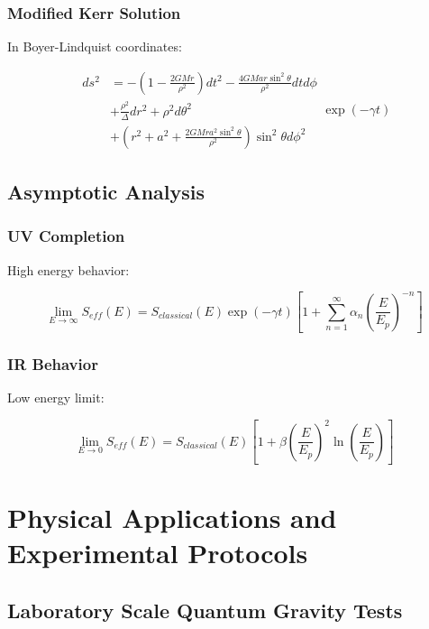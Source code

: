 \documentclass[12pt]{article}
\theoremstyle{plain}
\theoremstyle{definition}
\theoremstyle{remark}
\begin{document}
\subsubsection{Modified Kerr Solution}

In Boyer-Lindquist coordinates:

\begin{equation}
\begin{aligned}
ds^2 &= -\left(1 - \frac{2GMr}{\rho^2}\right)dt^2 - \frac{4GMar\sin^2\theta}{\rho^2}dtd\phi \\
&+ \frac{\rho^2}{\Delta}dr^2 + \rho^2d\theta^2 \\
&+ \left(r^2 + a^2 + \frac{2GMra^2\sin^2\theta}{\rho^2}\right)\sin^2\theta d\phi^2
\end{aligned}\exp(-\gamma t)
\end{equation}

\subsection{Asymptotic Analysis}

\subsubsection{UV Completion}

High energy behavior:

\begin{equation}
\lim_{E \to \infty} S_{eff}(E) = S_{classical}(E)\exp(-\gamma t)\left[1 + \sum_{n=1}^{\infty}\alpha_n\left(\frac{E}{E_p}\right)^{-n}\right]
\end{equation}

\subsubsection{IR Behavior}

Low energy limit:

\begin{equation}
\lim_{E \to 0} S_{eff}(E) = S_{classical}(E)\left[1 + \beta\left(\frac{E}{E_p}\right)^2\ln\left(\frac{E}{E_p}\right)\right]
\end{equation}
\section{Physical Applications and Experimental Protocols}

\subsection{Laboratory Scale Quantum Gravity Tests}
\end{document}
